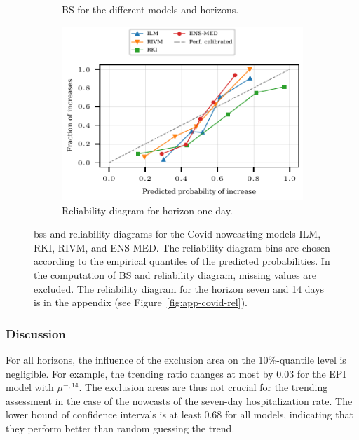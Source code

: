 \documentclass[pdflatex]{sn-jnl}
\theoremstyle{plain}%
\theoremstyle{definition}
\newcommand{\acc}{\mu}
\newcommand{\accml}[1][l]{\acc^{-,#1}}
\begin{document}
\begin{figure}
    \begin{subfigure}{0.48\textwidth}
        \centering
        \tiny
        
    \caption{BS for the different models and horizons.}\label{fig:app-covid-prob-brier}
    \end{subfigure}\hspace{0.01\textwidth}%
    \begin{subfigure}[t]{0.48\textwidth}
    \includegraphics{plots/covid_nowcast/60_reliability_diagram_lag_1}
    \caption{Reliability diagram for horizon one day.}\label{fig:app-covid-prob-rel-1}
    \end{subfigure}\hspace{0.01\textwidth}%
    \caption[Brier Scores and reliability diagrams for the Covid nowcasting models ILM, RKI, RIVM, and ENS-MED.]{\aclp{bs} and reliability diagrams for the Covid nowcasting models ILM, RKI, RIVM, and ENS-MED.
    The reliability diagram bins are chosen according to the empirical quantiles of the predicted probabilities.
    In the computation of BS and reliability diagram, missing values are excluded.
    The reliability diagram for the horizon seven and 14 days is in the appendix (see Figure~\ref{fig:app-covid-rel}).}
    \label{fig:app-covid-prob}
\end{figure}





\subsubsection*{Discussion}

For all horizons, the influence of the exclusion area on the 10\%-quantile level is negligible.
For example, the trending ratio changes at most by 0.03 for the EPI model with $\accml[14]$.
The exclusion areas are thus not crucial for the trending assessment in the case of the nowcasts of the seven-day hospitalization rate.
The lower bound of confidence intervals is at least 0.68 for all models, indicating that they perform better than random guessing the trend.
\end{document}
